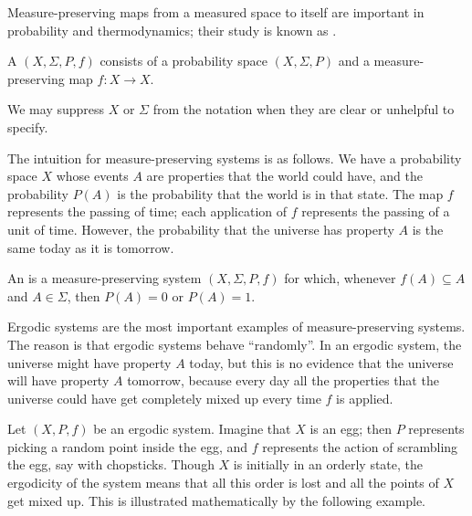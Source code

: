Measure-preserving maps from a measured space to itself are important in probability and thermodynamics; their study is known as .

\begin{definition}
A  $(X, \Sigma, P, f)$ consists of a probability space $(X, \Sigma, P)$ and a measure-preserving map $f: X \to X$.
\end{definition}

\begin{subsec}
We may suppress $X$ or $\Sigma$ from the notation when they are clear or unhelpful to specify.
\end{subsec}

\begin{subsec}
The intuition for measure-preserving systems is as follows.
We have a probability space $X$ whose events $A$ are properties that the world could have, and the probability $P(A)$ is the probability that the world is in that state.
The map $f$ represents the passing of time; each application of $f$ represents the passing of a unit of time.
However, the probability that the universe has property $A$ is the same today as it is tomorrow.
\end{subsec}

\begin{definition}
An  is a measure-preserving system $(X, \Sigma, P, f)$ for which, whenever $f(A) \subseteq A$ and $A \in \Sigma$, then $P(A) = 0$ or $P(A) = 1$.
\end{definition}

\begin{subsec}
Ergodic systems are the most important examples of measure-preserving systems.
The reason is that ergodic systems behave ``randomly''.
In an ergodic system, the universe might have property $A$ today, but this is no evidence that the universe will have property $A$ tomorrow, because every day all the properties that the universe could have get completely mixed up every time $f$ is applied.

Let $(X, P, f)$ be an ergodic system.
Imagine that $X$ is an egg; then $P$ represents picking a random point inside the egg, and $f$ represents the action of scrambling the egg, say with chopsticks.
Though $X$ is initially in an orderly state, the ergodicity of the system means that all this order is lost and all the points of $X$ get mixed up.
This is illustrated mathematically by the following example.
\end{subsec}

